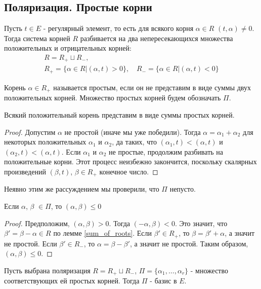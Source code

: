 \documentclass[a4article]{article}
\begin{document}
\subsection*{Поляризация. Простые корни}
Пусть $t \in E$ - регулярный элемент, то есть для всякого корня $\alpha \in R$ $(t, \alpha) \ne 0$. Тогда система корней $R$ разбивается на два непересекающихся множества положительных и отрицательных корней:
\begin{equation}
\begin{gathered}
    R = R_{+} \sqcup R_{-},\\
    R_{+}=\{\alpha \in R|(\alpha, t)>0\}, \quad R_{-}=\{\alpha \in R|(\alpha, t)<0\}
\end{gathered}
\end{equation}
\begin{definition}
    Корень $\alpha \in R_{+}$ называется простым, если он не представим в виде суммы двух положительных корней. Множество простых корней будем обозначать $\Pi$.
\end{definition}
\begin{lemma}
\label{decomp}
    Всякий положительный корень представим в виде суммы простых корней.
\end{lemma}
\begin{proof}
    Допустим $\alpha$ не простой (иначе мы уже победили). Тогда $\alpha = \alpha_1+\alpha_2$ для некоторых положительных $\alpha_1$ и $\alpha_2$, да таких, что $(\alpha_1, t) < (\alpha, t)$ и $(\alpha_2, t) < (\alpha, t)$. Если $\alpha_1$ и $\alpha_2$ не простые, продолжим разбивать на положительные корни. Этот процесс неизбежно закончится, поскольку скалярных произведений $(\beta, t)$, $\beta \in R_{+}$ конечное число.
\end{proof}
\begin{remark}
    Неявно этим же рассуждением мы проверили, что $\Pi$ непусто.
\end{remark}
\begin{lemma}
    Если $\alpha$, $\beta$ $\in \Pi$, то $(\alpha, \beta) \le 0$
\end{lemma}
\begin{proof}
    Предположим, $(\alpha, \beta) > 0$. Тогда $(-\alpha, \beta) < 0$. Это значит, что $\beta'=\beta - \alpha \in R$ по лемме \ref{sum_of_roots}. Если $\beta' \in R_{+}$, то $\beta = \beta'+\alpha$, а значит не простой. Если $\beta' \in R_{-}$, то $\alpha = \beta - \beta'$, а значит не простой. Таким образом, $(\alpha, \beta) \le 0$.
\end{proof}
\begin{theorem}
    Пусть выбрана поляризация $R = R_{+}\sqcup R_{-}$, $\Pi=\{\alpha_1, \ldots, \alpha_r\}$ - множество соответствующих ей простых корней. Тогда $\Pi$ - базис в $E$.
\end{theorem}
\end{document}
